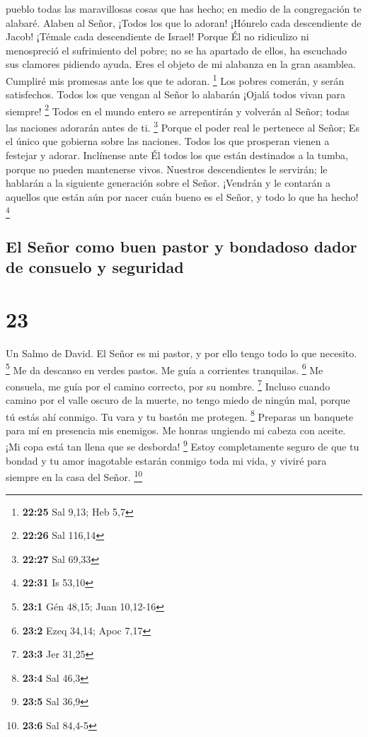 pueblo todas las maravillosas cosas que has hecho; en medio de la
congregación te alabaré.  Alaben al Señor, ¡Todos los que
lo adoran! ¡Hónrelo cada descendiente de Jacob! ¡Témale cada
descendiente de Israel!  Porque Él no ridiculizo ni
menospreció el sufrimiento del pobre; no se ha apartado de ellos, ha
escuchado sus clamores pidiendo ayuda.  Eres el objeto de
mi alabanza en la gran asamblea. Cumpliré mis promesas ante los que te
adoran. \footnote{\textbf{22:25} Sal 9,13; Heb 5,7}  Los
pobres comerán, y serán satisfechos. Todos los que vengan al Señor lo
alabarán ¡Ojalá todos vivan para siempre! \footnote{\textbf{22:26} Sal
  116,14}  Todos en el mundo entero se arrepentirán y
volverán al Señor; todas las naciones adorarán antes de ti. \footnote{\textbf{22:27}
  Sal 69,33}  Porque el poder real le pertenece al Señor;
Es el único que gobierna sobre las naciones.  Todos los que
prosperan vienen a festejar y adorar. Inclínense ante Él todos los que
están destinados a la tumba, porque no pueden mantenerse vivos.
 Nuestros descendientes le servirán; le hablarán a la
siguiente generación sobre el Señor.  ¡Vendrán y le
contarán a aquellos que están aún por nacer cuán bueno es el Señor, y
todo lo que ha hecho! \footnote{\textbf{22:31} Is 53,10}

\hypertarget{el-seuxf1or-como-buen-pastor-y-bondadoso-dador-de-consuelo-y-seguridad}{%
\subsection{El Señor como buen pastor y bondadoso dador de consuelo y
seguridad}\label{el-seuxf1or-como-buen-pastor-y-bondadoso-dador-de-consuelo-y-seguridad}}

\hypertarget{section-22}{%
\section{23}\label{section-22}}

Un Salmo de David.  El Señor es mi pastor, y por ello tengo
todo lo que necesito. \footnote{\textbf{23:1} Gén 48,15; Juan 10,12-16}
 Me da descanso en verdes pastos. Me guía a corrientes
tranquilas. \footnote{\textbf{23:2} Ezeq 34,14; Apoc 7,17} 
Me consuela, me guía por el camino correcto, por su nombre. \footnote{\textbf{23:3}
  Jer 31,25}  Incluso cuando camino por el valle oscuro de
la muerte, no tengo miedo de ningún mal, porque tú estás ahí conmigo. Tu
vara y tu bastón me protegen. \footnote{\textbf{23:4} Sal 46,3}
 Preparas un banquete para mí en presencia mis enemigos. Me
honras ungiendo mi cabeza con aceite. ¡Mi copa está tan llena que se
desborda! \footnote{\textbf{23:5} Sal 36,9}  Estoy
completamente seguro de que tu bondad y tu amor inagotable estarán
conmigo toda mi vida, y viviré para siempre en la casa del Señor.
\footnote{\textbf{23:6} Sal 84,4-5}

